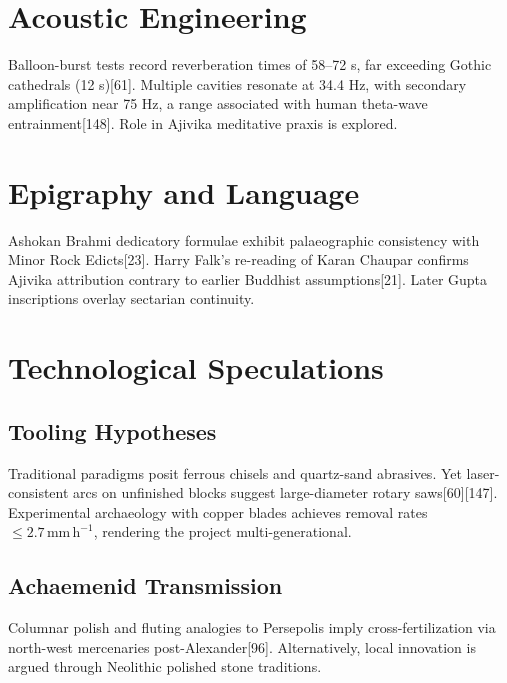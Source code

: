 \documentclass{article}
\begin{document}
\begin{multicols}{2}
\section{Acoustic Engineering}
Balloon-burst tests record reverberation times of 58–72 s, far exceeding Gothic cathedrals (12 s)[61]. Multiple cavities resonate at 34.4 Hz, with secondary amplification near 75 Hz, a range associated with human theta-wave entrainment[148]. Role in Ajivika meditative praxis is explored.
\section{Epigraphy and Language}
Ashokan Brahmi dedicatory formulae exhibit palaeographic consistency with Minor Rock Edicts[23]. Harry Falk’s re-reading of Karan Chaupar confirms Ajivika attribution contrary to earlier Buddhist assumptions[21]. Later Gupta inscriptions overlay sectarian continuity.
\section{Technological Speculations}
\subsection{Tooling Hypotheses}
Traditional paradigms posit ferrous chisels and quartz-sand abrasives. Yet laser-consistent arcs on unfinished blocks suggest large-diameter rotary saws[60][147]. Experimental archaeology with copper blades achieves removal rates \(\le 2.7\,\mathrm{mm\,h^{-1}}\), rendering the project multi-generational.
\subsection{Achaemenid Transmission}
Columnar polish and fluting analogies to Persepolis imply cross-fertilization via north-west mercenaries post-Alexander[96]. Alternatively, local innovation is argued through Neolithic polished stone traditions.

\end{multicols}
\end{document}
